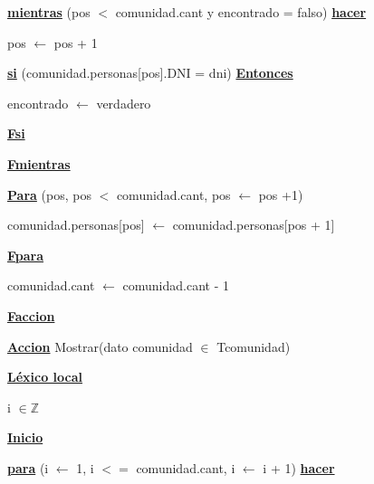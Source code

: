 \documentclass{article}
\begin{document}
            \hspace{12mm}\underline{\textbf{mientras}} (pos $<$ comunidad.cant y encontrado = falso) \underline{\textbf{hacer}}

                \hspace{16mm}pos $\leftarrow$ pos + 1

                \hspace{16mm}\underline{\textbf{si}} (comunidad.personas[pos].DNI = dni) \underline{\textbf{Entonces}}

                    \hspace{20mm}encontrado $\leftarrow$ verdadero

                \hspace{16mm}\underline{\textbf{Fsi}}

            \hspace{12mm}\underline{\textbf{Fmientras}}

            \hspace{12mm}\underline{\textbf{Para}} (pos, pos $<$ comunidad.cant, pos $\leftarrow$ pos +1)

                \hspace{16mm}comunidad.personas[pos] $\leftarrow$ comunidad.personas[pos + 1]

            \hspace{12mm}\underline{\textbf{Fpara}}

            \hspace{12mm}comunidad.cant $\leftarrow$ comunidad.cant - 1

    \hspace{4mm}\underline{\textbf{Faccion}}

    \vspace{4mm}

    \hspace{4mm}\underline{\textbf{Accion}} Mostrar(dato comunidad $\in$ Tcomunidad)

        \hspace{8mm}\underline{\textbf{Léxico local}}

            \hspace{12mm}i $\in \mathbb{Z}$

        \hspace{8mm}\underline{\textbf{Inicio}}

            \hspace{12mm}\underline{\textbf{para}} (i $\leftarrow$ 1, i $<=$ comunidad.cant, i $\leftarrow$ i + 1)
            \underline{\textbf{hacer}}
\end{document}

